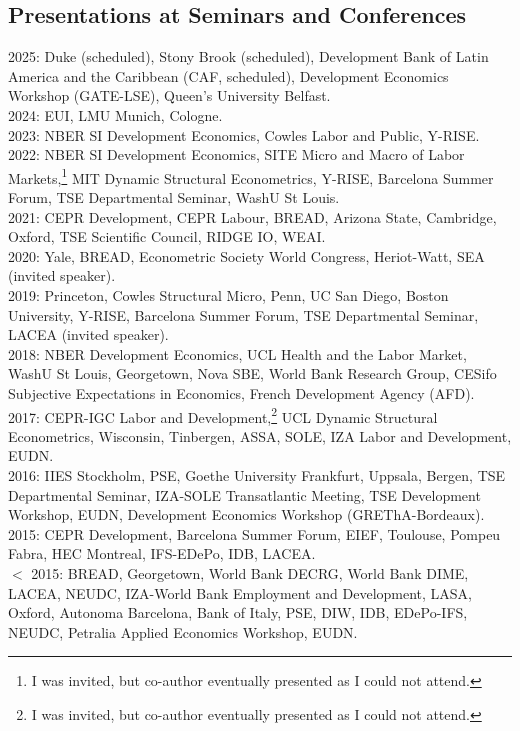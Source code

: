 \documentclass[12pt,english]{article}
\begin{document}
\subsection*{Presentations at Seminars and Conferences}
2025: Duke (scheduled), Stony Brook (scheduled), Development Bank of Latin America and the Caribbean (CAF, scheduled), Development Economics Workshop (GATE-LSE), Queen's University Belfast.\vspace{0.2cm} \\
2024:  EUI, LMU Munich, Cologne. \vspace{0.2cm} \\
2023: NBER SI Development Economics, Cowles Labor and Public, Y-RISE.\vspace{0.2cm} \\
2022: NBER SI Development Economics, SITE Micro and Macro of Labor Markets,\footnote{I was invited, but co-author eventually presented as I could not attend.} MIT Dynamic Structural Econometrics, Y-RISE, Barcelona Summer Forum, TSE Departmental Seminar, WashU St Louis.\vspace{0.2cm} \\
2021: CEPR Development, CEPR Labour, BREAD, Arizona State, Cambridge, Oxford, TSE Scientific Council, RIDGE IO, WEAI.\vspace{0.2cm} \\
2020: Yale, BREAD, Econometric Society World Congress, Heriot-Watt, SEA (invited speaker). \vspace{0.2cm} \\
2019: Princeton, Cowles Structural Micro, Penn, UC San Diego, Boston University, Y-RISE, Barcelona Summer Forum, TSE Departmental Seminar, LACEA (invited speaker).\vspace{0.2cm} \\
2018: NBER Development Economics, UCL Health and the Labor Market, WashU St Louis, Georgetown, Nova SBE, World Bank Research Group, CESifo Subjective Expectations in Economics, French Development Agency (AFD). \vspace{0.2cm} \\
2017: CEPR-IGC Labor and Development,\footnote{I was invited, but co-author eventually presented as I could not attend.} UCL Dynamic Structural Econometrics, Wisconsin, Tinbergen, ASSA, SOLE, IZA Labor and Development, EUDN.\vspace{0.2cm} \\
2016: IIES Stockholm, PSE, Goethe University Frankfurt, Uppsala, Bergen, TSE Departmental Seminar, IZA-SOLE Transatlantic Meeting, TSE Development Workshop, EUDN,  Development Economics Workshop (GREThA-Bordeaux).\vspace{0.2cm} \\
2015:  CEPR Development, Barcelona Summer Forum, EIEF, Toulouse, Pompeu Fabra, HEC Montreal, IFS-EDePo, IDB, LACEA.  \vspace{0.2cm} \\
$<$ 2015: BREAD, Georgetown, World Bank DECRG, World Bank DIME, LACEA, NEUDC, IZA-World Bank Employment and Development, LASA, Oxford, Autonoma Barcelona, Bank of Italy, PSE, DIW, IDB, EDePo-IFS, NEUDC, Petralia Applied Economics Workshop, EUDN.  
\end{document}
